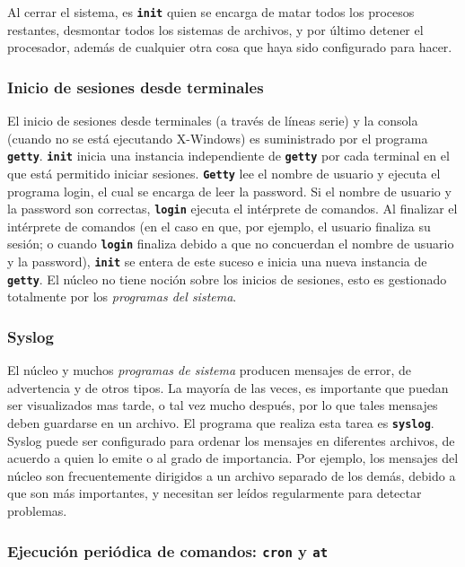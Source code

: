 \documentclass[12pt]{article}
\begin{document}
 Al cerrar el sistema, es \texttt{\textbf{init}} quien se encarga de
matar todos los procesos restantes, desmontar todos los sistemas de archivos, y
por último detener el procesador, además de cualquier otra cosa que haya sido
configurado para hacer.  



\subsubsection{Inicio de sesiones desde terminales}

 El inicio de sesiones desde terminales (a través de líneas serie) y la
consola (cuando no se está ejecutando X-Windows) es suministrado por el programa
\texttt{\textbf{getty}}. \texttt{\textbf{init}} inicia una instancia
independiente de \texttt{\textbf{getty}} por cada terminal en el que está permitido iniciar
sesiones. \texttt{\textbf{Getty}} lee el nombre de usuario y ejecuta el
programa login, el cual se encarga de leer la password. Si el nombre de usuario
y la password son correctas, \texttt{\textbf{login}} ejecuta el intérprete de
comandos.  Al finalizar el intérprete de comandos (en el caso en que, por
ejemplo, el usuario finaliza su sesión; o cuando \texttt{\textbf{login}} finaliza debido a que no
concuerdan el nombre de usuario y la password), \texttt{\textbf{init}} se
entera de este suceso e inicia una nueva instancia de \texttt{\textbf{getty}}.
El núcleo no tiene noción sobre los inicios de sesiones, esto es gestionado
totalmente por los \textit{programas del sistema}.  


\subsubsection{Syslog}

 El núcleo y muchos \textit{programas de sistema} producen
mensajes de error, de advertencia y de otros tipos. La mayoría de las veces, es
importante que puedan ser visualizados mas tarde, o tal vez mucho después, por
lo que tales mensajes deben guardarse en un archivo. El programa que realiza
esta tarea es \texttt{\textbf{syslog}}. Syslog puede ser configurado para
ordenar los mensajes en diferentes archivos, de acuerdo a quien lo emite o al
grado de importancia.  Por ejemplo, los mensajes del núcleo son frecuentemente
dirigidos a un archivo separado de los demás, debido a que son más importantes,
y necesitan ser leídos regularmente para detectar problemas.  

\subsubsection{Ejecución periódica de comandos: \texttt{\textbf{cron}} y
\texttt{\textbf{at}}}
\end{document}
